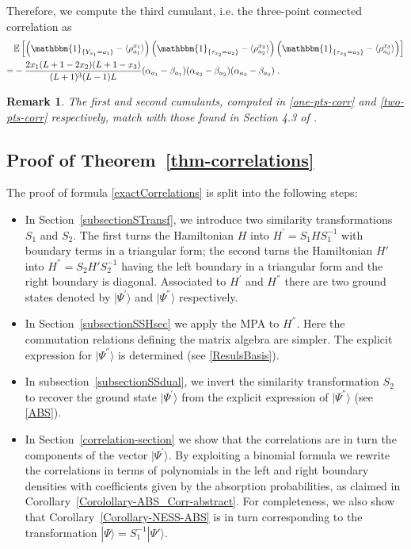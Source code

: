 \documentclass[10pt]{article}
\numberwithin{equation}{section}
\numberwithin{equation}{subsection}
\newtheorem{remark}{Remark}
\newcommand{\dt}{\;.}
\begin{document}
Therefore, we compute the third cumulant, i.e. the three-point connected correlation as 
\begin{align}
	&\mathbb{E}\left[\left(\mathbbm{1}_{\{Y_{x_{1}}=a_{1}\}}-\langle\rho_{a_{1}}^{x_{1}}\rangle \right)\left(\mathbbm{1}_{\{\tau_{x_{2}}=a_{2}\}}-\langle\rho_{a_{2}}^{x_{2}}\rangle \right)\left(\mathbbm{1}_{\{\tau_{x_{3}}=a_{3}\}}-\langle\rho_{a_{3}}^{x_{3}}\rangle \right)\right]\nonumber\\
	=&-\frac{2x_{1}(L+1-2x_{2})(L+1-x_{3})}{(L+1)^{3}(L-1)L}(\alpha_{a_{1}}-\beta_{a_{1}})(\alpha_{a_{2}}-\beta_{a_{2}})(\alpha_{a_{3}}-\beta_{a_{3}})\dt
\end{align}
\begin{remark} The first and second cumulants, computed in \eqref{one-pts-corr} and \eqref{two-pts-corr} respectively, match with those found in Section 4.3 of \cite{vanicat2017exact}.
	\end{remark}

\subsection{Proof of Theorem~\ref{thm-correlations}}
The proof of formula \eqref{exactCorrelations} is split into the following steps:
\begin{itemize}
	\item In Section~\ref{subsectionSTransf}, we introduce two similarity transformations $S_1$ and  $S_2$. 
	 The first turns the Hamiltonian $H$ into $H^{'}= S_{1} H S_{1}^{-1} $ with boundary terms in a triangular form;
	 the second  turns the Hamiltonian $H'$ into $H^{''} = S_{2}H' S_{2}^{-1}$ having the left boundary in a triangular form and the right boundary is diagonal.
	Associated to $H^{'}$ and $H^{''}$ there are two ground states denoted by $|\Psi^{'}\rangle$ and $|\Psi^{''}\rangle$ respectively. 
	\item In Section~\ref{subsectionSSHsec} we apply the MPA to $H^{''}$. Here the commutation relations defining the matrix algebra are simpler. The explicit expression for $|\Psi^{''}\rangle$ is determined (see \eqref{ResulsBasis}).
	\item In subsection~\ref{subsectionSSdual}, we invert the similarity transformation $S_2$ to recover  the ground state $|\Psi^{'}\rangle$ from the explicit expression of $|\Psi^{''}\rangle$  (see \eqref{ABS}).
	\item In Section~\ref{correlation-section} we show that the correlations are in turn the components of the vector $|\Psi^{'}\rangle$. 
	By exploiting a binomial formula we rewrite the correlations in terms
of polynomials in the left and right boundary densities with coefficients given by the absorption probabilities, as claimed in Corollary~\ref{Corolollary-ABS_Corr-abstract}.
	For completeness, we also show that Corollary~\ref{Corollary-NESS-ABS} is in turn corresponding to the transformation $|\Psi\rangle = S_{1}^{-1} |\Psi'\rangle$.
	\end{itemize}
\end{document}
